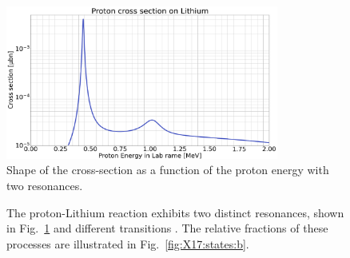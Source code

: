 \begin{refsection}
        \begin{figure}
            \centering
            \includegraphics[width = 0.8\textwidth]{Figures/X17/pLi_crossection.png}
            \caption[Proton-Lithium cross section]{Shape of the cross-section as a function of the proton energy \cite{X17:crossections} with two resonances.}
            \label{fig:X17:resonance}
        \end{figure}
        
        \begin{figure}
            \centering
            \hfill
            \caption[Energy levels and transitions of ]{The proton-Lithium reaction exhibits two distinct resonances, shown in Fig.~\ref{fig:X17:resonance} \cite{X17:crossections} and different transitions \cite{X17:Elevels:2004}. The relative fractions of these processes are illustrated in Fig.~\ref{fig:X17:states:b}.}
            \label{fig:X17:states}
        \end{figure}


\end{refsection}

